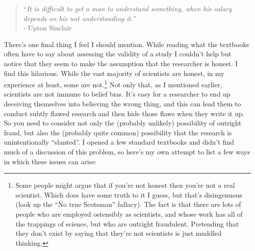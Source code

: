 \documentclass[
  a4paper,
]{book}
\begin{document}
\begin{quote}
``\emph{It is difficult to get a man to understand something, when his
salary depends on his not understanding it.}''\\
- Upton Sinclair
\end{quote}

There's one final thing I feel I should mention. While reading what the
textbooks often have to say about assessing the validity of a study I
couldn't help but notice that they seem to make the assumption that the
researcher is honest. I find this hilarious. While the vast majority of
scientists are honest, in my experience at least, some are
not.\footnote{Some people might argue that if you're not honest then
  you're not a real scientist. Which does have some truth to it I guess,
  but that's disingenuous (look up the ``No true Scotsman'' fallacy).
  The fact is that there are lots of people who are employed ostensibly
  as scientists, and whose work has all of the trappings of science, but
  who are outright fraudulent. Pretending that they don't exist by
  saying that they're not scientists is just muddled thinking.} Not only
that, as I mentioned earlier, scientists are not immune to belief bias.
It's easy for a researcher to end up deceiving themselves into believing
the wrong thing, and this can lead them to conduct subtly flawed
research and then hide those flaws when they write it up. So you need to
consider not only the (probably unlikely) possibility of outright fraud,
but also the (probably quite common) possibility that the research is
unintentionally ``slanted''. I opened a few standard textbooks and
didn't find much of a discussion of this problem, so here's my own
attempt to list a few ways in which these issues can arise:
\end{document}
